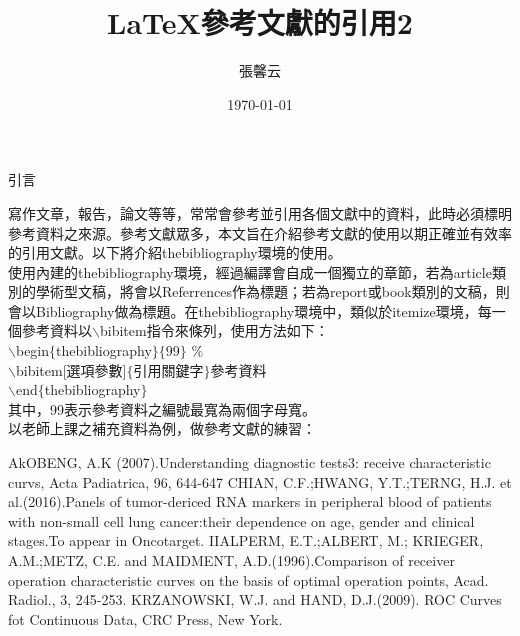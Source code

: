   

\title{ \LaTeX{\UD 參考文獻的引用2}}
\author{{\NC 張馨云}\;\; {}}
\date{{\BR \today}} 	


\maketitle
\fontsize{12}{22 pt}\selectfont

\centerline{{\BCF 引言}}
\setlength{\parindent}{2em}   
	寫作文章，報告，論文等等，常常會參考並引用各個文獻中的資料，此時必須標明參考資料之來源。參考文獻眾多，本文旨在介紹參考文獻的使用以期正確並有效率的引用文獻。以下將介紹thebibliography環境的使用。\\
	\indent 使用內建的thebibliography環境，經過編譯會自成一個獨立的章節，若為article類別的學術型文稿，將會以Referrences作為標題；若為report或book類別的文稿，則會以Bibliography做為標題。在thebibliography環境中，類似於itemize環境，每一個參考資料以$\backslash$bibitem指令來條列，使用方法如下： \\
	\indent$\backslash$begin$\{$thebibliography$\}\{$99$\}$ $\%$\\
	\indent$\backslash$bibitem[選項參數]$\{$引用關鍵字$\}$參考資料 \\
	\indent$\backslash$end$\{$thebibliography$\}$ \\
	\indent 其中，99表示參考資料之編號最寬為兩個字母寬。\\
	\indent 以老師上課之補充資料為例，做參考文獻的練習：
	\begin{thebibliography}{99}
		AkOBENG, A.K (2007).Understanding diagnostic tests3: receive characteristic curvs, Acta Padiatrica, 96, 644-647
		CHIAN, C.F.;HWANG, Y.T.;TERNG, H.J. et al.(2016).Panels of tumor-dericed RNA markers in peripheral blood of patients with non-small cell lung cancer:their dependence on age, gender and clinical stages.To appear in Oncotarget.
		IIALPERM, E.T.;ALBERT, M.; KRIEGER, A.M.;METZ, C.E. and MAIDMENT, A.D.(1996).Comparison of receiver operation characteristic curves on the basis of optimal operation points, Acad. Radiol., 3, 245-253.
		KRZANOWSKI, W.J. and HAND, D.J.(2009). ROC Curves fot Continuous Data, CRC Press, New York.		
	\end{thebibliography}
	
	